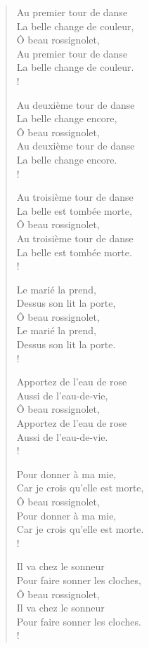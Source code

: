 \documentclass[french,twoside]{book} %
\begin{document}
\begin{verse}
Au premier tour de danse\\
La belle change de couleur,\\
Ô beau rossignolet,\\
Au premier tour de danse\\
La belle change de couleur.\\!

Au deuxième tour de danse\\
La belle change encore,\\
Ô beau rossignolet,\\
Au deuxième tour de danse\\
La belle change encore.\\!

Au troisième tour de danse\\
La belle est tombée morte,\\
Ô beau rossignolet,\\
Au troisième tour de danse\\
La belle est tombée morte.\\!

Le marié la prend,\\
Dessus son lit la porte,\\
Ô beau rossignolet,\\
Le marié la prend,\\
Dessus son lit la porte.\\!

Apportez de l’eau de rose\\
Aussi de l’eau-de-vie,\\
Ô beau rossignolet,\\
Apportez de l’eau de rose\\
Aussi de l’eau-de-vie.\\!

Pour donner à ma mie,\\
Car je crois qu’elle est morte,\\
Ô beau rossignolet,\\
Pour donner à ma mie,\\
Car je crois qu’elle est morte.\\!

Il va chez le sonneur\\
Pour faire sonner les cloches,\\
Ô beau rossignolet,\\
Il va chez le sonneur\\
Pour faire sonner les cloches.\\!


\end{verse}
\end{document}
